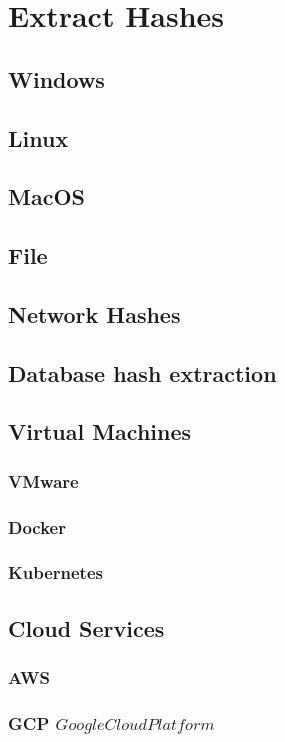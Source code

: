\chapter{Extract Hashes}

\section{Windows}
\section{Linux}
\section{MacOS}
\section{File}
\section{Network Hashes}
\section{Database hash extraction}
\section{Virtual Machines}
\subsection{VMware}
\subsection{Docker}
\subsection{Kubernetes}
\section{Cloud Services}
\subsection{AWS}
\subsection{GCP \(Google Cloud Platform\)}